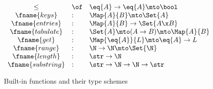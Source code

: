 \documentclass[preprint]{sigplanconf}
\newcommand{\uto}{\to}
\begin{document}
\begin{figure}
  \[\begin{array}{cll}
  \le &\of& \eq{A} \uto \eq{A} \mto \bool\\
  \fname{keys}     &:& \Map{A}{B} \mto \Set{A}\\
  \fname{entries}  &:& \Map{A}{B} \uto \Set{A \x B}\\
  \fname{tabulate} &:& \Set{A} \mto (A \to B) \mto \Map{A}{B}\\
  \fname{get}      &:& \Map{\eq{A}}{L} \mto \eq{A} \uto L\\
  \fname{range}    &:& \N \uto \N \mto \Set{\N}\\
  \fname{length}   &:& \str \uto \N\\
  \fname{substring} &:& \str \uto \N \uto \N \uto \str
  \end{array}\]
  \caption{Built-in functions and their type schemes}
\end{figure}
\end{document}
